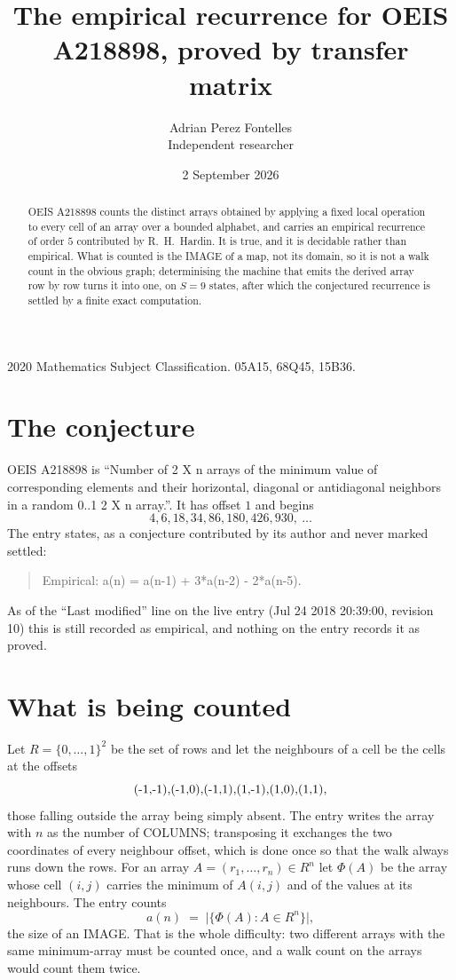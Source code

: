 \documentclass[11pt,a4paper]{article}
\title{The empirical recurrence for OEIS A218898, proved by transfer matrix}
\author{Adrian Perez Fontelles\\ \small Independent researcher}
\date{2 September 2026}
\theoremstyle{plain}
\theoremstyle{definition}
\begin{document}
\maketitle

\begin{abstract}
OEIS A218898 counts the distinct arrays obtained by applying a fixed local operation to every cell
of an array over a bounded alphabet, and carries an empirical recurrence of order $5$
contributed by R.~H.~Hardin. It is true, and it is decidable rather than empirical. What is
counted is the IMAGE of a map, not its domain, so it is not a walk count in the obvious graph;
determinising the machine that emits the derived array row by row turns it into one, on
$S=9$ states, after which the conjectured recurrence is settled by a finite exact
computation.
\end{abstract}

\noindent\small 2020 Mathematics Subject Classification. 05A15, 68Q45, 15B36.\normalsize

\section{The conjecture}

OEIS A218898 is ``Number of 2 X n arrays of the minimum value of corresponding elements and their horizontal, diagonal or antidiagonal neighbors in a random 0..1 2 X n array.''. It has offset $1$ and begins
\[
4, 6, 18, 34, 86, 180, 426, 930,\ \dots
\]
The entry states, as a conjecture contributed by its author and never marked settled:
\begin{quote}
Empirical: a(n) = a(n-1) + 3*a(n-2) - 2*a(n-5).
\end{quote}
As of the ``Last modified'' line on the live entry (Jul 24 2018 20:39:00, revision 10) this is still
recorded as empirical, and nothing on the entry records it as proved.

\section{What is being counted}

Let $R=\{0,\dots,1\}^{2}$ be the set of rows and let the neighbours of
a cell be the cells at the offsets
\[
$(-1,-1)$, $(-1,0)$, $(-1,1)$, $(1,-1)$, $(1,0)$, $(1,1)$,
\]
those falling outside the array being simply absent. The entry writes the array with $n$ as the number of COLUMNS; transposing it exchanges the two coordinates of every neighbour offset, which is done once so that the walk always runs down the rows. For an array
$A=(r_1,\dots,r_n)\in R^n$ let $\Phi(A)$ be the array whose cell $(i,j)$ carries the
minimum of $A(i,j)$ and of the values at its neighbours. The entry counts
\[
a(n)\;=\;\bigl|\{\Phi(A):A\in R^n\}\bigr| ,
\]
the size of an IMAGE. That is the whole difficulty: two different arrays with the same
minimum-array must be counted once, and a walk count on the arrays would count them twice.
\end{document}
